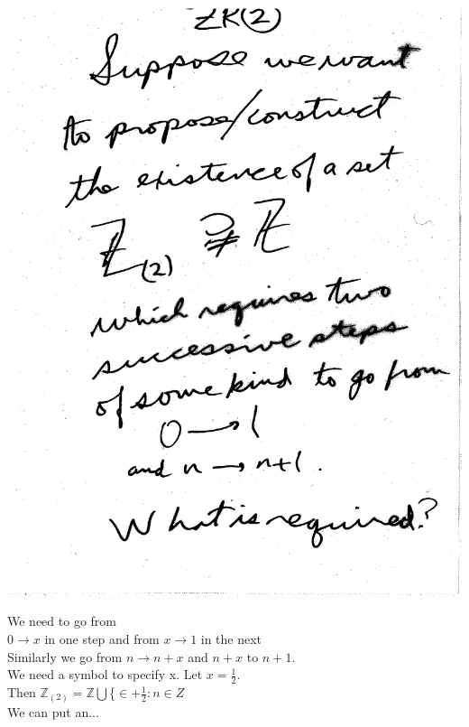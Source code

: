 \documentclass[10pt,a4paper]{article}
\begin{document}
{{\includegraphics[scale=0.5]{Pages/ZR_2}

\newpage

We need to go from\\
$0\rightarrow x$ in one step and from $x\rightarrow1$ in the next\\
Similarly we go from $n\rightarrow n+x$ and $n+x$ to $n+1$.\\
We need a symbol to specify x. Let $x=\frac{1}{2}$.\\
Then $\mathbb{Z}_{(2)}=\mathbb{Z}\bigcup$\{$\in+\frac{1}{2}:n\in{Z}$\\
We can put an...

}}
\end{document}
